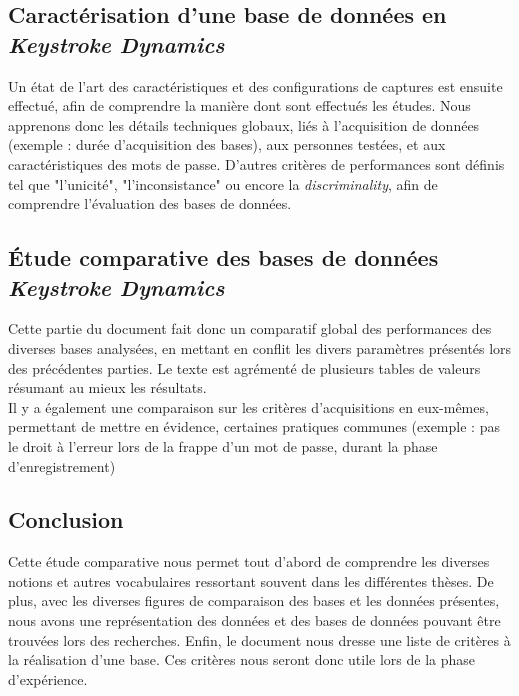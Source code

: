\subsection{Caractérisation d'une base de données en \textit{Keystroke Dynamics}}

Un état de l'art des caractéristiques et des configurations de captures est ensuite effectué, afin de comprendre la manière dont sont effectués les études. Nous apprenons donc les détails techniques globaux, liés à l'acquisition de données (exemple : durée d'acquisition des bases), aux personnes testées, et aux caractéristiques des mots de passe. D'autres critères de performances sont  définis tel que "l'unicité", "l'inconsistance" ou encore la \textit{discriminality}, afin de comprendre l'évaluation des bases de données.

\subsection{Étude comparative des bases de données \textit{Keystroke Dynamics}}

Cette partie du document fait donc un comparatif global des performances des diverses bases analysées, en mettant en conflit les divers paramètres présentés lors des précédentes parties. Le texte est agrémenté de plusieurs tables de valeurs résumant au mieux les résultats.\\

Il y a également une comparaison sur les critères d'acquisitions en eux-mêmes, permettant de mettre en évidence, certaines pratiques communes (exemple : pas le droit à l'erreur lors de la frappe d'un mot de passe, durant la phase d'enregistrement)

\subsection{Conclusion}

Cette étude comparative nous permet tout d'abord de comprendre les diverses notions et autres vocabulaires ressortant souvent dans les différentes thèses. De plus, avec les diverses figures de comparaison des bases et les données présentes, nous avons une représentation des données et des bases de données pouvant être trouvées lors des recherches. Enfin, le document nous dresse une liste de critères à la réalisation d'une base. Ces critères nous seront donc utile lors de la phase d'expérience.
